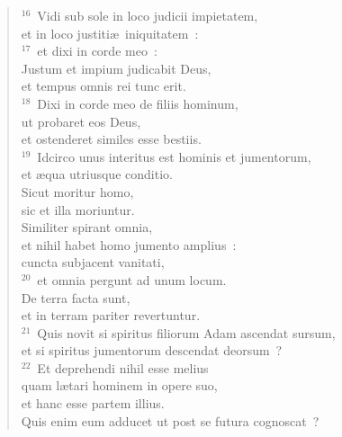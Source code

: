 \begin{flushleft}\begin{verse}${}^{16}$~Vidi sub sole in loco judicii impietatem,\\ et in loco justiti\ae\ iniquitatem~:\\
${}^{17}$~et dixi in corde meo~:\\ Justum et impium judicabit Deus,\\ et tempus omnis rei tunc erit.\\
${}^{18}$~Dixi in corde meo de filiis hominum,\\ ut probaret eos Deus,\\ et ostenderet similes esse bestiis.\\
${}^{19}$~Idcirco unus interitus est hominis et jumentorum,\\ et \ae qua utriusque conditio.\\ Sicut moritur homo,\\ sic et illa moriuntur.\\ Similiter spirant omnia,\\ et nihil habet homo jumento amplius~:\\ cuncta subjacent vanitati,\\
${}^{20}$~et omnia pergunt ad unum locum.\\ De terra facta sunt,\\ et in terram pariter revertuntur.\\
${}^{21}$~Quis novit si spiritus filiorum Adam ascendat sursum,\\ et si spiritus jumentorum descendat deorsum~?\\
${}^{22}$~Et deprehendi nihil esse melius\\ quam l\ae tari hominem in opere suo,\\ et hanc esse partem illius.\\ Quis enim eum adducet ut post se futura cognoscat~?\end{verse}\end{flushleft}



